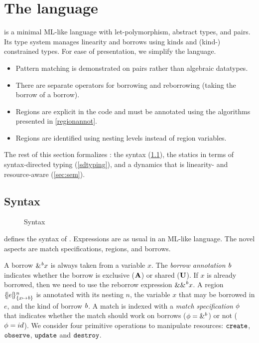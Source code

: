 \section{The \lang language}

\lang is a minimal ML-like language with
let-polymorphism, abstract types, and pairs. Its type system manages
linearity and borrows using kinds and (kind-) constrained types.
For ease of presentation, we simplify the language.
\begin{itemize}
\item Pattern matching is demonstrated on pairs rather than algebraic
  datatypes.
\item There are separate operators for borrowing and reborrowing (taking
  the borrow of a borrow).
\item Regions are explicit in the code and must be annotated using the
  algorithms presented in \cref{regionannot}.
\item Regions are identified using nesting levels instead of region
  variables.
\end{itemize}

The rest of this section formalizes  \lang: the syntax (\cref{syntax}),
the statics in terms of syntax-directed typing (\cref{sdtyping}),
and a dynamics that is linearity- and resource-aware (\cref{sec:sem}).

\subsection{Syntax}
\label{syntax}

\begin{figure}[!tb]
  
  \caption{Syntax}
  \label{grammar}
  \vspace{-10pt}
\end{figure}


 defines the syntax of \lang. Expressions are as usual
in an ML-like language.  The novel aspects are match
specifications, regions, and borrows.

A borrow $\borrow{x}$ is always taken from a variable $x$. The
\emph{borrow annotation} $\BORROW$ indicates whether the borrow is exclusive
($\MBORROW$) or shared ($\IBORROW$). If $x$ is already borrowed,
then we need to use the reborrow expression $\reborrow{x}$.
%
A region $\region{\Sone x\BORROW}{e}$ is annotated with its nesting $n$, the variable $x$ that may be borrowed in $e$, and the kind of borrow $\BORROW$.
%
A match is indexed with a \emph{match specification} $\etransfm$ that indicates
whether the match should work on borrows ($\etransfm=\&^b$) or not ($\etransfm=id$).
%
We consider four primitive operations to manipulate resources:
$\create$, $\observe$, $\update$ and $\destroy$.

